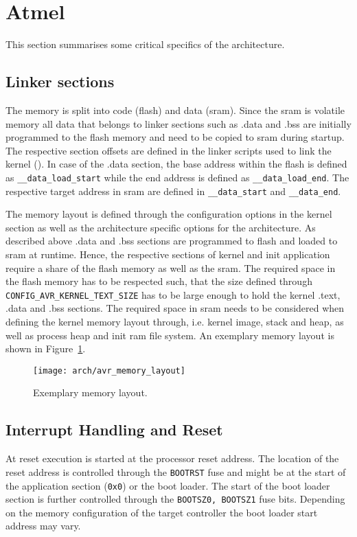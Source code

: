 %
%
%



\section{Atmel \avr}
	This section summarises some critical specifics of the \avr architecture.

	\subsection{Linker sections}
		The \avr memory is split into code (flash) and data (\gls{sram}). Since the \gls{sram} is volatile memory all data that belongs to linker sections such as .data and .bss are initially programmed to the flash memory and need to be copied to \gls{sram} during startup. The respective section offsets are defined in the linker scripts used to link the kernel (). In case of the .data section, the base address within the flash is defined as \lstinline{__data_load_start} while the end address is defined as \lstinline{__data_load_end}. The respective target address in \gls{sram} are defined in \lstinline{__data_start} and \lstinline{__data_end}.

		The memory layout is defined through the configuration options in the kernel section as well as the architecture specific options for the \avr architecture. As described above .data and .bss sections are programmed to flash and loaded to \gls{sram} at runtime. Hence, the respective sections of kernel and init application require a share of the flash memory as well as the \gls{sram}. The required space in the flash memory has to be respected such, that the size defined through \lstinline{CONFIG_AVR_KERNEL_TEXT_SIZE} has to be large enough to hold the kernel .text, .data and .bss sections. The required space in \gls{sram} needs to be considered when defining the kernel memory layout through, i.e. kernel image, stack and heap, as well as process heap and init ram file system. An exemplary memory layout is shown in Figure~\ref{fig:avr_memory_layout}.
		\begin{figure}[h]
			\centering	
			\texttt{[image: arch/avr\_memory\_layout]}
			\caption{Exemplary \avr memory layout.}
			\label{fig:avr_memory_layout}
		\end{figure}

	\subsection{Interrupt Handling and Reset}
		At reset execution is started at the processor reset address. The location of the reset address is controlled through the \lstinline{BOOTRST} fuse and might be at the start of the application section (\lstinline{0x0}) or the boot loader. The start of the boot loader section is further controlled through the \lstinline{BOOTSZ0, BOOTSZ1} fuse bits. Depending on the memory configuration of the target controller the boot loader start address may vary.
		
